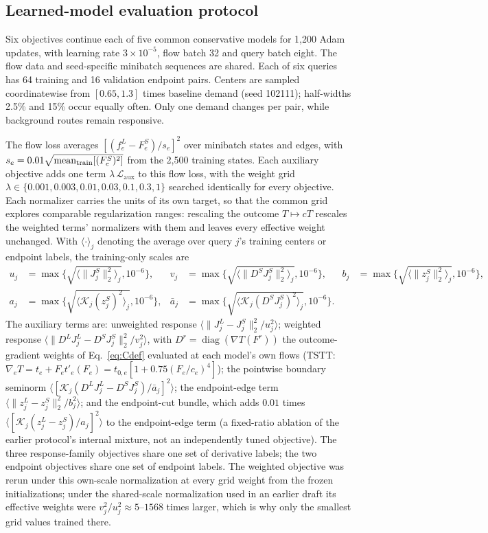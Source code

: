 \subsection{Learned-model evaluation protocol}\label{app:pairs-v102}
Six objectives continue each of five common conservative models for
1,200 Adam updates, with learning rate $3\times10^{-5}$, flow batch 32
and query batch eight. The flow data and seed-specific minibatch
sequences are shared. Each of six queries has 64 training and 16
validation endpoint pairs. Centers are sampled coordinatewise from
$[0.65,1.3]$ times baseline demand (seed 102111); half-widths 2.5\% and
15\% occur equally often. Only one demand changes per pair, while
background routes remain responsive.

The flow loss averages $[(f_e^L-F_e^S)/s_e]^2$ over minibatch states
and edges, with $s_e=0.01\sqrt{\operatorname{mean}_{\rm train}[(F_e^S)^2]}$ from the
2,500 training states. Each auxiliary objective adds one term
$\lambda\,\mathcal L_{\mathrm{aux}}$ to this flow loss, with the weight
grid $\lambda\in\{0.001,0.003,0.01,0.03,0.1,0.3,1\}$ searched
identically for every objective. Each normalizer carries the units of
its own target, so that the common grid explores comparable
regularization ranges: rescaling the outcome $T\mapsto cT$ rescales
the weighted terms' normalizers with them and leaves every effective
weight unchanged. With
$\langle\cdot\rangle_j$ denoting the average over query $j$'s training
centers or endpoint labels, the training-only scales are
\[
\begin{aligned}
u_j&=\max\{\sqrt{\langle\|J_j^S\|_2^2\rangle_j},10^{-6}\},&
v_j&=\max\{\sqrt{\langle\|D^SJ_j^S\|_2^2\rangle_j},10^{-6}\},&
b_j&=\max\{\sqrt{\langle\|z_j^S\|_2^2\rangle_j},10^{-6}\},\\
a_j&=\max\{\sqrt{\langle\mathcal K_j(z_j^S)^2\rangle_j},10^{-6}\},&
\bar a_j&=\max\{\sqrt{\langle\mathcal K_j(D^SJ_j^S)^2\rangle_j},10^{-6}\}.
\end{aligned}
\]
The auxiliary terms are: unweighted response
$\langle\|J_j^L-J_j^S\|_2^2/u_j^2\rangle$; weighted response
$\langle\|D^LJ_j^L-D^SJ_j^S\|_2^2/v_j^2\rangle$, with
$D^r=\operatorname{diag}(\nabla T(F^r))$ the outcome-gradient weights
of Eq.~\eqref{eq:Cdef} evaluated at each model's own flows (TSTT:
$\nabla_eT=t_e+F_et'_e(F_e)=t_{0,e}[1+0.75(F_e/c_e)^4]$);
the pointwise boundary seminorm
$\langle[\mathcal K_j(D^LJ_j^L-D^SJ_j^S)/\bar a_j]^2\rangle$; the
endpoint-edge term
$\langle\|z_j^L-z_j^S\|_2^2/b_j^2\rangle$; and the endpoint-cut bundle,
which adds $0.01$ times
$\langle[\mathcal K_j(z_j^L-z_j^S)/a_j]^2\rangle$ to the endpoint-edge
term (a fixed-ratio ablation of the earlier protocol's internal
mixture, not an independently tuned objective). The three
response-family objectives share one set of derivative labels; the two
endpoint objectives share one set of endpoint labels. The weighted
objective was rerun under this own-scale normalization at every grid
weight from the frozen initializations; under the shared-scale
normalization used in an earlier draft its effective weights were
$v_j^2/u_j^2\approx5$--$1568$ times larger, which is why only the
smallest grid values trained there.

